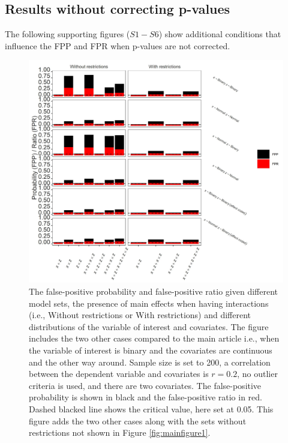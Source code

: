 \subsection{Results without correcting p-values}
The following supporting figures ($S1 - S6$) show additional conditions that influence the FPP and FPR when p-values are not corrected.

\label{result}
\begin{figure}[ht!]
\includegraphics[width=1\textwidth]{R/Analysis/Result/Figures/Figure1ASI.jpeg}
\centering
\caption{The false-positive probability and false-positive ratio given different model sets, the presence of main effects when having interactions (i.e., Without restrictions or With restrictions) and different distributions of the variable of interest and covariates. The figure includes the two other cases compared to the main article i.e., when the variable of interest is binary and the covariates are continuous and the other way around. Sample size is set to 200, a correlation between the dependent variable and covariates is $\textit{r}=0.2$, no outlier criteria is used, and there are two covariates. The false-positive probability is shown in black and the false-positive ratio in red. Dashed blacked line shows the critical value, here set at 0.05. This figure adds the two other cases along with the sets without restrictions not shown in Figure \ref{fig:mainfigure1}.}
\label{fig:appfigure1}
\end{figure}

